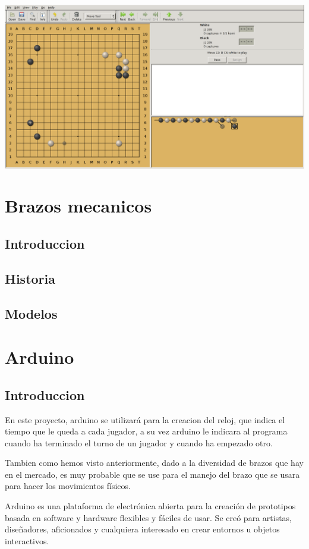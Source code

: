 \documentclass[12pt,a4paper]{report}
\begin{document}
\includegraphics[scale=0.33]{quarry.png}


\chapter{Brazos mecanicos}
\section{Introduccion}
\section{Historia}
\section{Modelos}

\chapter{Arduino}
\section{Introduccion}
En este proyecto, arduino se utilizará para la creacion del reloj, que indica el tiempo que le queda a cada jugador, a su vez arduino le indicara al programa cuando ha terminado el turno de un jugador y cuando ha empezado otro.

Tambien como hemos visto anteriormente, dado a la diversidad de brazos que hay en el mercado, es muy probable que se use para el manejo del brazo que se usara para hacer los movimientos físicos.

Arduino es una plataforma de electrónica abierta para la creación de prototipos basada en software y hardware flexibles y fáciles de usar. Se creó para artistas, diseñadores, aficionados y cualquiera interesado en crear entornos u objetos interactivos.
\end{document}

